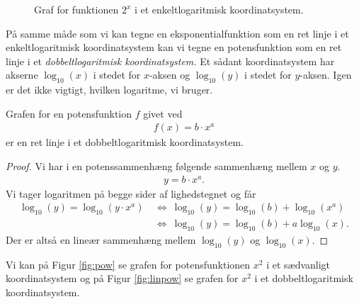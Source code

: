 \documentclass[12pt]{article}
\begin{document}
\begin{figure}[H]
\begin{minipage}{0.48\textwidth}
{
 	}
 	\caption{Graf for funktionen $2^x$ i et enkeltlogaritmisk koordinatsystem.}
 	\label{fig:linexp}
	\end{minipage}
\end{figure}

På samme måde som vi kan tegne en eksponentialfunktion som en ret linje i et enkeltlogaritmisk koordinatsystem kan vi tegne en potensfunktion som en ret linje i et \textit{dobbeltlogaritmisk koordinatsystem.} Et sådant koordinatsystem har akserne $\log_{10}(x)$ i stedet for $x$-aksen og $\log_{10}(y)$ i stedet for $y$-aksen. Igen er det ikke vigtigt, hvilken logaritme, vi bruger.
\begin{setn}
	Grafen for en potensfunktion $f$ givet ved
	\begin{align*}
		f(x) = b\cdot x^a
	\end{align*}
	er en ret linje i et dobbeltlogaritmisk koordinatsystem.
\end{setn}
\begin{proof}
	Vi har i en potenssammenhæng følgende sammenhæng mellem $x$ og $y$.
	\begin{align*}
		y = b\cdot x^a.
	\end{align*}
	Vi tager logaritmen på begge sider af lighedstegnet og får
	\begin{align*}
	 	\log_{10}(y) = \log_{10}(y \cdot x^a) \ &\Leftrightarrow \ \log_{10}(y) = \log_{10}(b) + 
	 	\log_{10}(x^a) \\
	 	&\Leftrightarrow	 \ \log_{10}(y) = \log_{10}(b) + a \log_{10}(x).
	\end{align*}
	Der er altså en lineær sammenhæng mellem $\log_{10}(y)$ og $\log_{10}(x)$.
\end{proof}
Vi kan på Figur \ref{fig:pow} se grafen for potensfunktionen $x^2$ i et sædvanligt koordinatsystem og på Figur \ref{fig:linpow} se grafen for $x^2$ i et dobbeltlogaritmisk koordinatsystem. 
\end{document}
